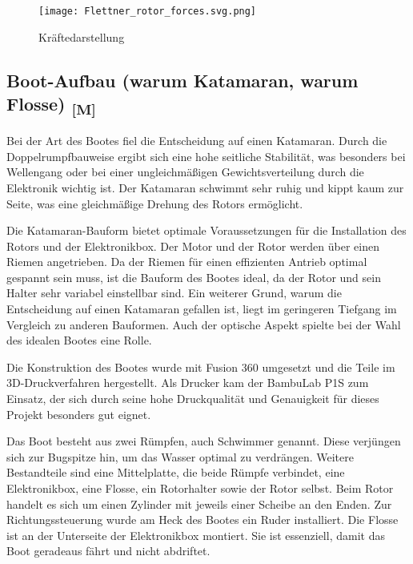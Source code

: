 \documentclass[a4paper,12pt]{article}
\begin{document}
\begin{figure}[H]
    \centering
    \texttt{[image: Flettner\_rotor\_forces.svg.png]}
    \caption{Kräftedarstellung\cite{Flettner_Rotor_Wiki}}
    \label{fig:Kräftedarstellung}
\end{figure}



\newpage


\subsection{\texorpdfstring{Boot-Aufbau (warum Katamaran, warum Flosse) \textsubscript{[M]}}{Boot-Aufbau (warum Katamaran, warum Flosse) [M]}}
Bei der Art des Bootes fiel die Entscheidung auf einen Katamaran. Durch die Doppelrumpfbauweise ergibt sich eine hohe seitliche Stabilität, was besonders bei Wellengang oder bei einer ungleichmäßigen Gewichtsverteilung durch die Elektronik wichtig ist. Der Katamaran schwimmt sehr ruhig und kippt kaum zur Seite, was eine gleichmäßige Drehung des Rotors ermöglicht.\newline

Die Katamaran-Bauform bietet optimale Voraussetzungen für die Installation des Rotors und der Elektronikbox. Der Motor und der Rotor werden über einen Riemen angetrieben. Da der Riemen für einen effizienten Antrieb optimal gespannt sein muss, ist die Bauform des Bootes ideal, da der Rotor und sein Halter sehr variabel einstellbar sind. Ein weiterer Grund, warum die Entscheidung auf einen Katamaran gefallen ist, liegt im geringeren Tiefgang im Vergleich zu anderen Bauformen. Auch der optische Aspekt spielte bei der Wahl des idealen Bootes eine Rolle.\newline

Die Konstruktion des Bootes wurde mit Fusion 360 umgesetzt und die Teile im 3D-Druckverfahren hergestellt. Als Drucker kam der BambuLab P1S zum Einsatz, der sich durch seine hohe Druckqualität und Genauigkeit für dieses Projekt besonders gut eignet.

Das Boot besteht aus zwei Rümpfen, auch Schwimmer genannt. Diese verjüngen sich zur Bugspitze hin, um das Wasser optimal zu verdrängen. Weitere Bestandteile sind eine Mittelplatte, die beide Rümpfe verbindet, eine Elektronikbox, eine Flosse, ein Rotorhalter sowie der Rotor selbst. Beim Rotor handelt es sich um einen Zylinder mit jeweils einer Scheibe an den Enden. Zur Richtungssteuerung wurde am Heck des Bootes ein Ruder installiert. Die Flosse ist an der Unterseite der Elektronikbox montiert. Sie ist essenziell, damit das Boot geradeaus fährt und nicht abdriftet.\newline
\end{document}
